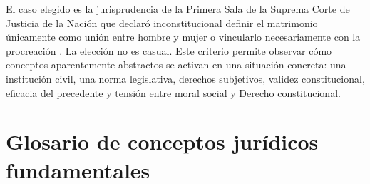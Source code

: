 \documentclass[
	spanish,
	letterpaper, oneside
]{article}
\begin{document}
El caso elegido es la jurisprudencia de la Primera Sala de la Suprema Corte de Justicia de la Nación que declaró inconstitucional definir el matrimonio únicamente como unión entre hombre y mujer o vincularlo necesariamente con la procreación \citep{scjnMatrimonio2015}. La elección no es casual. Este criterio permite observar cómo conceptos aparentemente abstractos se activan en una situación concreta: una institución civil, una norma legislativa, derechos subjetivos, validez constitucional, eficacia del precedente y tensión entre moral social y Derecho constitucional.

\section{Glosario de conceptos jurídicos fundamentales}
\end{document}
